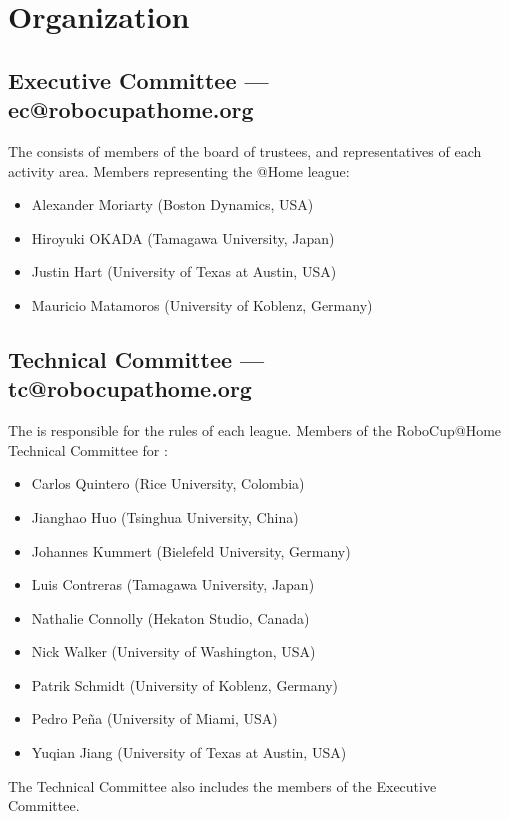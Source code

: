 \section{Organization}

\subsection{Executive Committee --- ec@robocupathome.org}
\label{sec:ec}
The  consists of members of the board of trustees, and representatives of each activity area. Members representing the @Home league:
\begin{itemize}
	\item Alexander Moriarty (Boston Dynamics, USA)
	\item Hiroyuki OKADA (Tamagawa University, Japan)
	\item Justin Hart (University of Texas at Austin, USA)
	\item Mauricio Matamoros (University of Koblenz, Germany)
\end{itemize}

\subsection{Technical Committee --- tc@robocupathome.org}
\label{sec:tc}
The  is responsible for the rules of each league. Members of the RoboCup@Home Technical Committee for \YEAR:
\begin{itemize}
	\item Carlos Quintero (Rice University, Colombia)
	\item Jianghao Huo (Tsinghua University, China)
	\item Johannes Kummert (Bielefeld University, Germany)
	\item Luis Contreras (Tamagawa University, Japan)
	\item Nathalie Connolly (Hekaton Studio, Canada)
	\item Nick Walker (University of Washington, USA)
	\item Patrik Schmidt (University of Koblenz, Germany)
	\item Pedro Peña (University of Miami, USA)
	\item Yuqian Jiang (University of Texas at Austin, USA)
\end{itemize}
The Technical Committee also includes the members of the Executive Committee.

